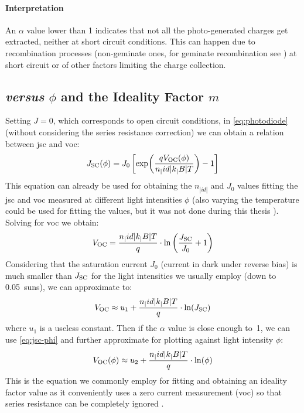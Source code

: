 		\paragraph{Interpretation} 
		An $\alpha$ value lower than 1 indicates that not all the photo\hyp{}generated charges get extracted, neither at short circuit conditions.
		This can happen due to recombination processes (non-geminate ones, for geminate recombination see ) at short circuit \cite{Credgington2011} or of other factors limiting the charge collection. 

	\subsection{ \textsl{versus} $\phi$ and the Ideality Factor $m$}
		Setting $J=0$, which corresponds to open circuit conditions, in \cref{eq:photodiode} (without considering the series resistance correction) we can obtain a relation between \gls{jsc} and \gls{voc}:
		\begin{equation}
		J_\mathrm{SC}(\phi) = J_0\left[\exp(\frac{qV_\mathrm{OC} (\phi)}{n_|id|k_|B|T})-1\right]
		\end{equation}
		This equation can already be used for obtaining the $n_|id|$ and $J_0$ values fitting the \gls{jsc} and \gls{voc} measured at different light intensities $\phi$ (also varying the temperature could be used for fitting the values, but it was not done during this thesis \cite{Tvingstedt2016}).
		Solving for \gls{voc} we obtain:
		\begin{equation}V_\mathrm{OC} = \frac{n_|id|k_|B|T}{q}\cdot\ln\left(\frac{J_\mathrm{SC}}{J_0} + 1\right)\end{equation}
		Considering that the saturation current $J_0$ (current in dark under reverse bias) is much smaller than $J_\mathrm{SC}$ for the light intensities we usually employ (down to \SI{0.05}{suns}), we can approximate to:
		\begin{equation}
		V_\mathrm{OC} \approx u_1 + \frac{n_|id|k_|B|T}{q}\cdot\ln(J_\mathrm{SC})
		\end{equation}
		where $u_1$ is a useless constant.
		Then if the $\alpha$ value is close enough to~1, we can use \cref{eq:jsc-phi} and further approximate for plotting against light intensity $\phi$:
		\begin{equation}\label{eq:voc_vs_phi}
			V_\mathrm{OC} (\phi) \approx u_2 + \frac{n_|id|k_|B|T}{q}\cdot\ln(\phi)
		\end{equation}
		This is the equation we commonly employ for fitting and obtaining an ideality factor value \cite{Nelson2003} as it conveniently uses a zero current measurement (\gls{voc}) so that series resistance can be completely ignored \cite{Kirchartz2012}.
